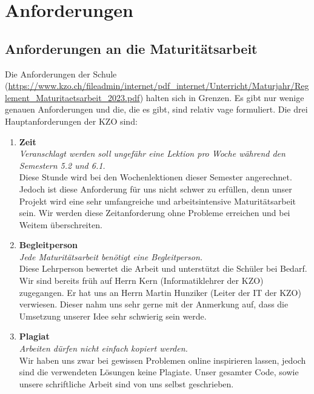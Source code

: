 \chapter{Anforderungen}

\section{Anforderungen an die Maturitätsarbeit}
Die Anforderungen der Schule (\url{https://www.kzo.ch/fileadmin/internet/pdf_internet/Unterricht/Maturjahr/Reglement_Maturitaetsarbeit_2023.pdf}) halten sich in Grenzen. Es gibt nur wenige genauen Anforderungen
und die, die es gibt, sind relativ vage formuliert. Die drei Hauptanforderungen der KZO sind:
\begin{enumerate}
    \item \textbf{Zeit} \\
        \textit{Veranschlagt werden soll ungefähr eine Lektion pro Woche während den Semestern 5.2 und 6.1. }\\Diese Stunde wird bei den Wochenlektionen dieser Semester angerechnet.
        Jedoch ist diese Anforderung für uns nicht schwer zu erfüllen, denn unser Projekt wird eine sehr umfangreiche und arbeitsintensive Maturitätsarbeit sein.
        Wir werden diese Zeitanforderung ohne Probleme erreichen und bei Weitem überschreiten.
    \item \textbf{Begleitperson} \\
        \textit{Jede Maturitätsarbeit benötigt eine Begleitperson. }\\Diese Lehrperson bewertet die Arbeit und unterstützt die Schüler bei Bedarf.
        Wir sind bereits früh auf Herrn Kern (Informatiklehrer der KZO) zugegangen.
        Er hat uns an Herrn Martin Hunziker (Leiter der IT der KZO) verwiesen. Dieser nahm uns sehr gerne mit der Anmerkung auf, dass die Umsetzung unserer Idee sehr schwierig sein werde.
    \item \textbf{Plagiat} \\
        \textit{Arbeiten dürfen nicht einfach kopiert werden. }\\Wir haben uns zwar bei gewissen Problemen online inspirieren lassen, jedoch sind die verwendeten Lösungen keine Plagiate.
        Unser gesamter Code, sowie unsere schriftliche Arbeit sind von uns selbst geschrieben.
\end{enumerate}

